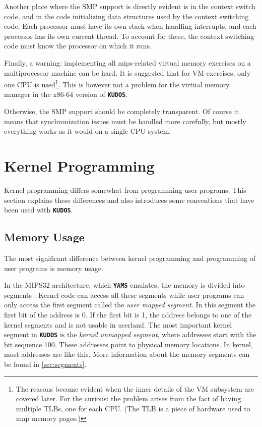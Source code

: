\documentclass[twoside,a4paper]{report}
\newcommand{\kudos}{\texttt{\textbf{KUDOS}}}
\newcommand{\yams}{\texttt{\textbf{YAMS}}}
\begin{document}
Another place where the SMP support is directly evident is in the
context switch code, and in the code initializing data structures used
by the context switching code. Each processor must have its own stack
when handling interrupts, and each processor has its own current
thread. To account for these, the context switching code must know the
processor on which it runs.

Finally, a warning: implementing all mips-related virtual memory exercises on a
multiprocessor machine can be hard. It is suggested that for VM
exercises, only one CPU is used\footnote{The reasons become evident
when the inner details of the VM subsystem are covered later. For the
curious: the problem arises from the fact of having multiple TLBs, one
for each CPU. (The TLB is a piece of hardware used to map memory pages.)}.
This is however not a problem for the virtual memory manager in the x86-64
version of \kudos{}.

Otherwise, the SMP support should be completely transparent. Of course
it means that synchronization issues must be handled more carefully,
but mostly everything works as it would on a single CPU system.

\section{Kernel Programming}


Kernel programming differs somewhat from programming user
programs. This section explains these differences and also introduces
some conventions that have been used with \kudos{}.

\subsection{Memory Usage}


The most significant difference between kernel programming and
programming of user programs is memory usage. 

In the MIPS32 architecture, which \yams{} emulates, the memory is divided into
segments . Kernel code
can access all these segments while user programs can only access the
first segment called the \emph{user mapped segment}. In this segment
the first bit of the address is 0. If the first bit is 1, the address
belongs to one of the kernel segments and is not usable in
userland. The most important kernel segment in \kudos{} is the
\emph{kernel unmapped segment}, where addresses start with the bit
sequence 100. These addresses point to physical memory locations. In
kernel, most addresses are like this.  More information about the
memory segments can be found in \autoref{sec:segments}.
\end{document}

